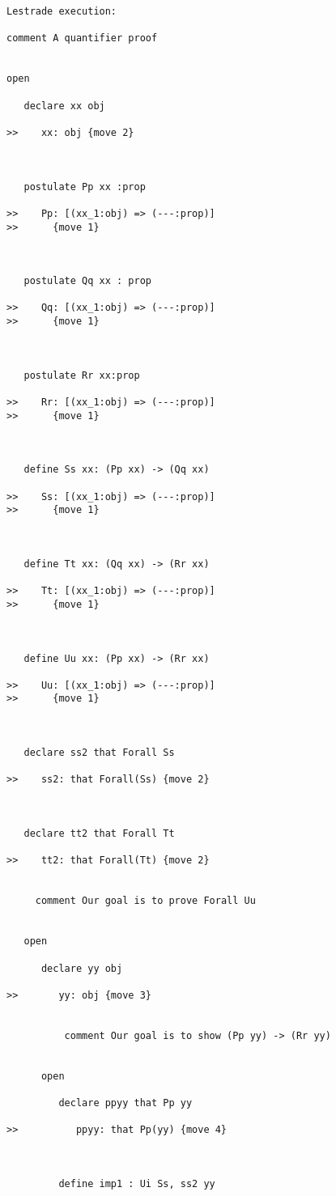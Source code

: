 \documentclass[12pt]{article}
\begin{document}
\begin{verbatim}Lestrade execution:

comment A quantifier proof


open

   declare xx obj

>>    xx: obj {move 2}



   postulate Pp xx :prop

>>    Pp: [(xx_1:obj) => (---:prop)]
>>      {move 1}



   postulate Qq xx : prop

>>    Qq: [(xx_1:obj) => (---:prop)]
>>      {move 1}



   postulate Rr xx:prop

>>    Rr: [(xx_1:obj) => (---:prop)]
>>      {move 1}



   define Ss xx: (Pp xx) -> (Qq xx)

>>    Ss: [(xx_1:obj) => (---:prop)]
>>      {move 1}



   define Tt xx: (Qq xx) -> (Rr xx)

>>    Tt: [(xx_1:obj) => (---:prop)]
>>      {move 1}



   define Uu xx: (Pp xx) -> (Rr xx)

>>    Uu: [(xx_1:obj) => (---:prop)]
>>      {move 1}



   declare ss2 that Forall Ss

>>    ss2: that Forall(Ss) {move 2}



   declare tt2 that Forall Tt

>>    tt2: that Forall(Tt) {move 2}


     comment Our goal is to prove Forall Uu


   open

      declare yy obj

>>       yy: obj {move 3}


          comment Our goal is to show (Pp yy) -> (Rr yy)


      open

         declare ppyy that Pp yy

>>          ppyy: that Pp(yy) {move 4}



         define imp1 : Ui Ss, ss2 yy


\end{verbatim}
\end{document}
